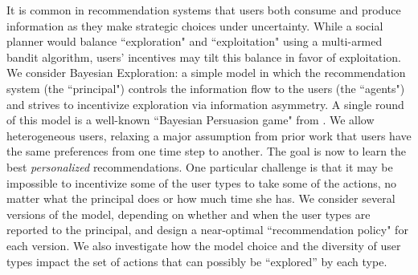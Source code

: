 It is common in recommendation systems that users both consume and produce information as they make strategic choices under uncertainty. While a social planner would balance ``exploration" and ``exploitation" using a multi-armed bandit algorithm, users’ incentives may tilt this balance in favor of exploitation. We consider Bayesian Exploration: a simple model in which the recommendation system (the ``principal") controls the information flow to the users (the ``agents") and strives to incentivize exploration via information asymmetry. A single round of this model is a well-known ``Bayesian Persuasion game" from \cite{Kamenica-aer11}. We allow heterogeneous users, relaxing a major assumption from prior work that users have the same preferences from one time step to another. The goal is now to learn the best \emph{personalized} recommendations. One particular challenge is that it may be impossible to incentivize some of the user types to take some of the actions, no matter what the principal does or how much time she has. We consider several versions of the model, depending on whether and when the user types are reported to the principal, and design a near-optimal ``recommendation policy" for each version. We also investigate how the model choice and the diversity of user types impact the set of actions that can possibly be “explored” by each type.

